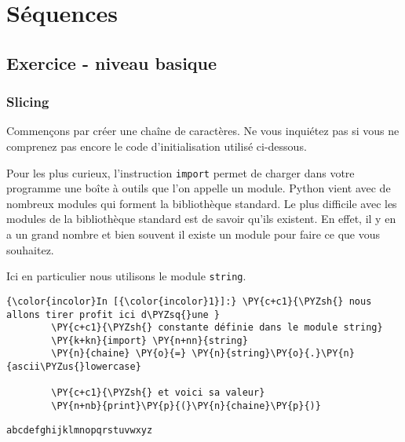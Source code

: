     
    
    
    

    

    \hypertarget{suxe9quences}{%
\section{Séquences}\label{suxe9quences}}

    \hypertarget{exercice---niveau-basique}{%
\subsection{Exercice - niveau basique}\label{exercice---niveau-basique}}

    \hypertarget{slicing}{%
\subsubsection{Slicing}\label{slicing}}

    Commençons par créer une chaîne de caractères. Ne vous inquiétez pas si
vous ne comprenez pas encore le code d'initialisation utilisé
ci-dessous.

Pour les plus curieux, l'instruction \texttt{import} permet de charger
dans votre programme une boîte à outils que l'on appelle un module.
Python vient avec de nombreux modules qui forment la bibliothèque
standard. Le plus difficile avec les modules de la bibliothèque standard
est de savoir qu'ils existent. En effet, il y en a un grand nombre et
bien souvent il existe un module pour faire ce que vous souhaitez.

Ici en particulier nous utilisons le module \texttt{string}.

    \begin{Verbatim}[commandchars=\\\{\},frame=single,framerule=0.3mm,rulecolor=\color{cellframecolor}]
{\color{incolor}In [{\color{incolor}1}]:} \PY{c+c1}{\PYZsh{} nous allons tirer profit ici d\PYZsq{}une }
        \PY{c+c1}{\PYZsh{} constante définie dans le module string}
        \PY{k+kn}{import} \PY{n+nn}{string}
        \PY{n}{chaine} \PY{o}{=} \PY{n}{string}\PY{o}{.}\PY{n}{ascii\PYZus{}lowercase}
        
        \PY{c+c1}{\PYZsh{} et voici sa valeur}
        \PY{n+nb}{print}\PY{p}{(}\PY{n}{chaine}\PY{p}{)}
\end{Verbatim}


    \begin{Verbatim}[commandchars=\\\{\},frame=single,framerule=0.3mm,rulecolor=\color{cellframecolor}]
abcdefghijklmnopqrstuvwxyz
\end{Verbatim}

